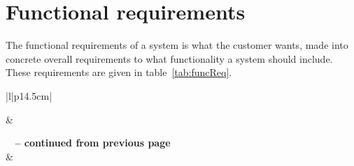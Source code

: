 \section{Functional requirements}
The functional requirements of a system is what the customer wants, made into concrete overall requirements to what functionality a system should include. These requirements are given in table~\ref{tab:funcReq}.
\begin{longtable}{|l|p{14.5cm}|}

\hline
{} &  \\
\endfirsthead


%
{{\bfseries \tablename\ \thetable{} -- continued from previous page}} \\\hline
{} &  \\
\endhead

 \\ \hline
\endfoot
 
\endlastfoot


\end{longtable}
